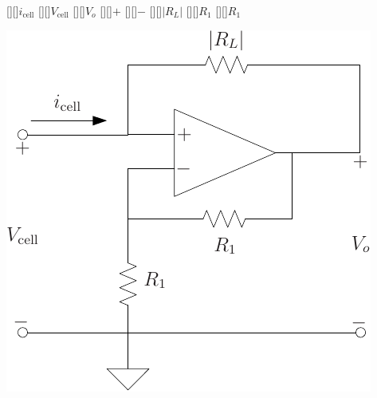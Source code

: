 [][]{$i_\text{cell}$}
[][]{$V_\text{cell}$}
[][]{$V_o$}
\psfrag{+}[][]{$+$}
\psfrag{-}[][]{$-$}
[][]{$|R_L|$}
[][]{$R_1$}
[][]{$R_1$}

\centering
\includegraphics[width=0.9\columnwidth]{nrc}
